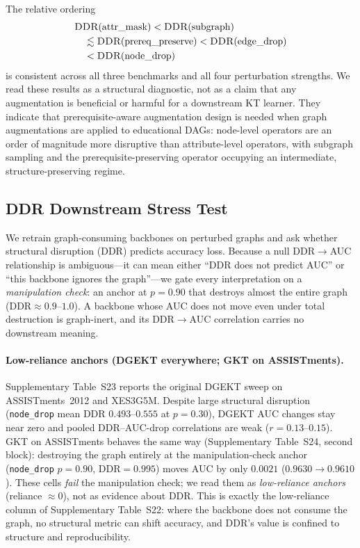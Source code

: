 \documentclass[preprint,10pt,doubleblind]{elsarticle}
\newcommand{\DDR}{\textsc{DDR}}
\begin{document}
The relative ordering
\begin{equation*}
\begin{aligned}
&\DDR(\mathrm{attr\_mask}) < \DDR(\mathrm{subgraph}) \\
&\quad\lesssim \DDR(\mathrm{prereq\_preserve}) < \DDR(\mathrm{edge\_drop}) \\
&\quad < \DDR(\mathrm{node\_drop})
\end{aligned}
\end{equation*}
is consistent across all three benchmarks and all four perturbation
strengths. We read these results as a structural diagnostic, not as a
claim that any augmentation is beneficial or harmful for a downstream
KT learner. They indicate that prerequisite-aware augmentation design
is needed when graph augmentations are applied to educational DAGs:
node-level operators are an order of magnitude more disruptive than
attribute-level operators, with subgraph sampling and the
prerequisite-preserving operator occupying an intermediate,
structure-preserving regime.

\subsection{\DDR{} Downstream Stress Test}
\label{sec:exp-ddr-downstream}
We retrain graph-consuming backbones on perturbed graphs and ask whether
structural disruption (\DDR{}) predicts accuracy loss. Because a null
\DDR{}$\to$AUC relationship is ambiguous---it can mean either ``\DDR{} does not
predict AUC'' or ``this backbone ignores the graph''---we gate every
interpretation on a \emph{manipulation check}: an anchor at $p{=}0.90$ that
destroys almost the entire graph (\DDR{}${\approx}0.9$--$1.0$). A backbone whose
AUC does not move even under total destruction is graph-inert, and its
\DDR{}$\to$AUC correlation carries no downstream meaning.

\paragraph{Low-reliance anchors (DGEKT everywhere; GKT on ASSISTments).}
Supplementary Table~S23 reports the original DGEKT sweep on
ASSISTments~2012 and XES3G5M. Despite large structural disruption
(\texttt{node\_drop} mean \DDR{} $0.493$--$0.555$ at $p{=}0.30$), DGEKT AUC
changes stay near zero and pooled \DDR{}--AUC-drop correlations are weak
($r{=}0.13$--$0.15$). GKT on ASSISTments behaves the same way
(Supplementary Table~S24, second block): destroying the graph
entirely at the manipulation-check anchor (\texttt{node\_drop} $p{=}0.90$,
\DDR{}${=}0.995$) moves AUC by only $0.0021$ ($0.9630{\to}0.9610$). These cells
\emph{fail} the manipulation check; we read them as \emph{low-reliance anchors}
(reliance ${\approx}0$), not as evidence about \DDR{}. This is exactly the
low-reliance column of Supplementary Table~S22:
where the backbone does not consume the graph, no structural metric can shift
accuracy, and \DDR{}'s value is confined to structure and reproducibility.
\end{document}
